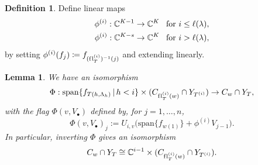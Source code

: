 \documentclass[11pt]{amsart}
\newtheorem{lemma}[theorem]{Lemma}     %
\theoremstyle{definition}
\newtheorem{definition}[theorem]{Definition}
\newcommand{\st}{\,|\,}
\newcommand{\vspan}{\mathrm{span}}
\newcommand{\la}{\lambda}
\newcommand{\fl}{\mathrm{f\hspace{0.25pt}l}}
\begin{document}
\begin{definition}
 Define linear maps
\begin{align}
    \phi^{(i)} : \bC^{K-1} \to \bC^K & \,\,\,\text{  for  }i\leq \ell(\la),\\
    \phi^{(i)} : \bC^{K-s} \to \bC^K & \,\,\,\text{  for  }i > \ell(\la),
\end{align}
by setting $\phi^{(i)}(f_j) \coloneqq f_{(\fl_T^{(i)})^{-1}(j)}$ and extending linearly.
\end{definition}

\begin{lemma}\label{lem:CellRecursion}
We have an isomorphism
  \begin{equation}
\Phi: \vspan\{f_{T(h,\Lambda_h)}\st h<i\} \times (C_{\fl_T^{(i)}(w)} \cap Y_{T^{(i)}}) \to C_w\cap Y_T,
 \end{equation}
with the flag $\Phi(v, V_\bullet)$ defined by, for $j=1, \ldots, n$,
\begin{equation}
\Phi(v, V_\bullet)_j := U_{i,v}\big(\vspan\{f_{w(1)}\} + \phi^{(i)}V_{j-1}\big).
\end{equation}
In particular, inverting $\Phi$ gives an isomorphism
 \begin{equation}
 C_w \cap Y_T \cong \bC^{i-1} \times (C_{\fl^{(i)}_T(w)}\cap Y_{T^{(i)}}).
 \end{equation}
\end{lemma}
\end{document}
